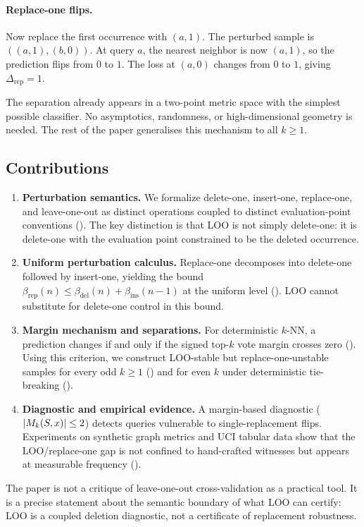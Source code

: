 \paragraph{Replace-one flips.}
Now replace the first occurrence with $(a,1)$.  The perturbed sample is
$((a,1),(b,0))$.  At query $a$, the nearest neighbor is now $(a,1)$, so the
prediction flips from $0$ to $1$.  The loss at $(a,0)$ changes from $0$ to
$1$, giving $\Delta_{\mathrm{rep}}=1$.

The separation already appears in a two-point metric space with the simplest
possible classifier.  No asymptotics, randomness, or high-dimensional geometry
is needed.  The rest of the paper generalises this mechanism to all $k \ge 1$.

\subsection{Contributions}

\begin{enumerate}[leftmargin=*,label=(\arabic*)]
    \item \textbf{Perturbation semantics.}  We formalize delete-one,
        insert-one, replace-one, and leave-one-out as distinct operations
        coupled to distinct evaluation-point conventions
        ().  The key distinction is that LOO
        is not simply delete-one: it is delete-one with the evaluation point
        constrained to be the deleted occurrence.
    \item \textbf{Uniform perturbation calculus.}  Replace-one decomposes into
        delete-one followed by insert-one, yielding the bound
        $\beta_{\mathrm{rep}}(n) \le \beta_{\mathrm{del}}(n) +
        \beta_{\mathrm{ins}}(n-1)$ at the uniform level
        ().  LOO cannot substitute for delete-one
        control in this bound.
    \item \textbf{Margin mechanism and separations.}  For deterministic $k$-NN,
        a prediction changes if and only if the signed top-$k$ vote margin
        crosses zero ().  Using this criterion, we
        construct LOO-stable but replace-one-unstable samples for every odd $k
        \ge 1$ () and for even $k$ under
        deterministic tie-breaking ().
    \item \textbf{Diagnostic and empirical evidence.}  A margin-based
        diagnostic ($|M_k(S,x)| \le 2$) detects queries vulnerable to
        single-replacement flips.  Experiments on synthetic graph metrics and
        UCI tabular data show that the LOO/replace-one gap is not confined to
        hand-crafted witnesses but appears at measurable frequency
        ().
\end{enumerate}

\noindent The paper is not a critique of leave-one-out cross-validation as a
practical tool.  It is a precise statement about the semantic boundary of what
LOO can certify: LOO is a coupled deletion diagnostic, not a certificate of
replacement robustness.
